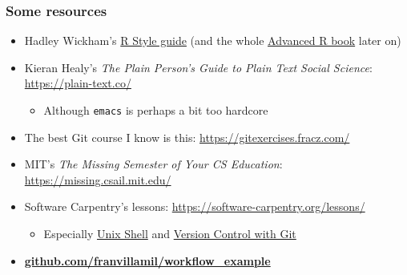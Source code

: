 \documentclass[aspectratio=43]{beamer}
\begin{document}
\begin{frame}
\frametitle{Some resources}
\centering

\begin{itemize}
  \item Hadley Wickham's \href{http://adv-r.had.co.nz/Style.html}{R Style guide} (and the whole \href{http://adv-r.had.co.nz/}{Advanced R book} later on)
    \item Kieran Healy's \textit{The Plain Person’s Guide to Plain Text Social Science}: \href{https://plain-text.co/}{https://plain-text.co/}
  \begin{itemize}
    \item Although \texttt{emacs} is perhaps a bit too hardcore
  \end{itemize}
  \item The best Git course I know is this: \href{https://gitexercises.fracz.com/}{https://gitexercises.fracz.com/}
  \item MIT's \textit{The Missing Semester of Your CS Education}: \href{https://missing.csail.mit.edu/}{https://missing.csail.mit.edu/}
  \item Software Carpentry's lessons: \href{https://software-carpentry.org/lessons/}{https://software-carpentry.org/lessons/}
  \begin{itemize}
    \item Especially \href{https://swcarpentry.github.io/shell-novice/}{Unix Shell} and \href{https://swcarpentry.github.io/git-novice/}{Version Control with Git}
  \end{itemize}
  \item \href{https://github.com/franvillamil/workflow_example}{\textbf{github.com/franvillamil/workflow\_example}}
\end{itemize}

\end{frame}
\end{document}
